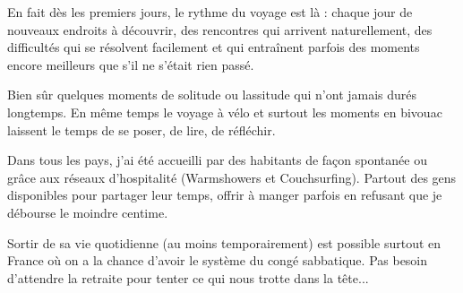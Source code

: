  En fait dès les premiers jours, le rythme du voyage est là : chaque jour de nouveaux endroits à découvrir, des rencontres qui arrivent naturellement, des difficultés qui se résolvent facilement et qui entraînent parfois des moments encore meilleurs que s'il ne s'était rien passé.

 Bien sûr quelques moments de solitude ou lassitude qui n'ont jamais durés longtemps. En même temps le voyage à vélo et surtout les moments en bivouac laissent le temps de se poser, de lire, de réfléchir.

 Dans tous les pays, j'ai été accueilli par des habitants de façon spontanée ou grâce aux réseaux d'hospitalité (Warmshowers et Couchsurfing). Partout des gens disponibles pour partager leur temps, offrir à manger parfois en refusant que je débourse le moindre centime.

 Sortir de sa vie quotidienne (au moins temporairement) est possible surtout en France où on a la chance d'avoir le système du congé sabbatique. Pas besoin d'attendre la retraite pour tenter ce qui nous trotte dans la tête...
